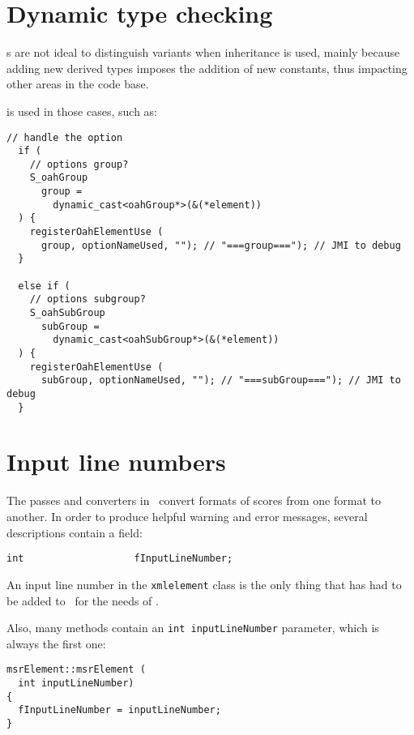 \section{Dynamic type checking}

\EnumType s are not ideal to distinguish variants when inheritance is used, mainly because adding new derived types imposes the addition of new constants, thus impacting other areas in the code base.

 is used in those cases, such as:
\begin{lstlisting}[language=CPlusPlus]
  // handle the option
  if (
    // options group?
    S_oahGroup
      group =
        dynamic_cast<oahGroup*>(&(*element))
  ) {
    registerOahElementUse (
      group, optionNameUsed, ""); // "===group==="); // JMI to debug
  }

  else if (
    // options subgroup?
    S_oahSubGroup
      subGroup =
        dynamic_cast<oahSubGroup*>(&(*element))
  ) {
    registerOahElementUse (
      subGroup, optionNameUsed, ""); // "===subGroup==="); // JMI to debug
  }
\end{lstlisting}


\section{Input line numbers}

The passes and converters in \mf\ convert formats of scores from one format to another. In order to produce helpful warning and error messages, several descriptions contain a field:
\begin{lstlisting}[language=CPlusPlus]
    int                   fInputLineNumber;
\end{lstlisting}

An input line number in the {\tt xmlelement} class is the only thing that has had to be added to \libmusicxml\ for the needs of \mf.

Also, many methods contain an {\tt int inputLineNumber} parameter, which is always the first one:
\begin{lstlisting}[language=CPlusPlus]
msrElement::msrElement (
  int inputLineNumber)
{
  fInputLineNumber = inputLineNumber;
}
\end{lstlisting}

